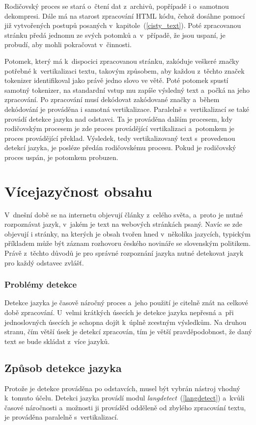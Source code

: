 Rodičovský proces se stará o~čtení dat z~archivů, popřípadě i o~samotnou dekompresi. Dále má na starost zpracování
HTML kódu, čehož dosáhne pomocí již vytvořených postupů posaných v~kapitole~(\ref{cisty_text}). Poté zpracovanou stránku
předá jednomu ze svých potomků a~v~případě, že jsou uspaní, je probudí, aby mohli pokračovat v~činnosti.

Potomek, který má k~dispocici zpracovanou stránku, zakóduje veškeré značky potřebné k~vertikalizaci textu, takovým
způsobem, aby každou z~těchto značek tokenizer identifikoval jako právě jedno slovo ve větě. Poté potomek spustí samotný
tokenizer, na standardní vstup mu zapíše výsledný text a~počká na jeho zpracování. Po zpracování musí dekódovat
zakódované značky a~během dekódování je prováděna i samotná vertikalizace. Paralelně s~vertikalizací se také
provádí detekce jazyka nad odstavci. Ta je prováděna dalším procesem, kdy rodičovským procesem je zde proces
provádějící vertikalizaci a~potomkem je proces provádějící překlad. Výsledek, tedy vertikalizovaný text
s~provedenou detekcí jazyka, je posléze předán rodičovskému procesu. Pokud je rodičovský proces uspán, je potomkem probuzen.

\section{Vícejazyčnost obsahu}
V~dnešní době se na internetu objevují články z~celého světa, a~proto je nutné rozpoznávat jazyk, v~jakém je text na
webových stránkách psaný. Navíc se zde objevují i stránky, na kterých je obsah tvořen hned v~několika jazycích, typickým
příkladem může být záznam rozhovoru českého novináře se slovenským politikem. Právě z~těchto důvodů je pro správné
rozpoznání jazyka nutné detekovat jazyk pro každý odstavec zvlášť.

\subsubsection{Problémy detekce}
Detekce jazyka je časově náročný proces a~jeho použití je citelně znát na celkové době zpracování. U~velmi krátkých
úsecích je detekce jazyka nepřesná a~při jednoslovných úsecích je schopna dojít k~úplně zcestným výsledkům. Na druhou stranu,
čím větší úsek je detekcí zpracován, tím je větší pravděpodobnost, že daný text se bude skládat z~více jazyků.

\subsection{Způsob detekce jazyka}
Protože je detekce prováděna po odstavcích, musel být vybrán nástroj vhodný k~tomuto účelu.
Detekci jazyka provádí modul \textit{langdetect}~(\ref{langdetect}) a~kvůli časové náročnosti
a~možnosti ji prováděd odděleně od zbylého zpracování textu, je prováděna paralelně
s~vertikalizací.


